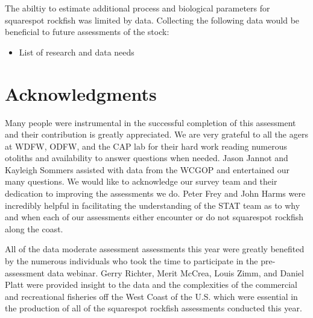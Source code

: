 \documentclass[11pt,
  english,
  a4paper,
]{article}
\begin{document}
\leavevmode\tagmcend\tagstructend


The abiltiy to estimate additional process and biological parameters for squarespot rockfish was limited by data. Collecting the following data would be beneficial to future assessments of the stock:

\leavevmode\tagmcend\tagstructend\par

\begin{itemize}

    \item List of research and data needs

\end{itemize}


\hypertarget{acknowledgments}{%
\section{Acknowledgments}\label{acknowledgments}}

\leavevmode\tagmcend\tagstructend


Many people were instrumental in the successful completion of this assessment and their contribution is greatly appreciated. We are very grateful to all the agers at WDFW, ODFW, and the CAP lab for their hard work reading numerous otoliths and availability to answer questions when needed. Jason Jannot and Kayleigh Sommers assisted with data from the WCGOP and entertained our many questions. We would like to acknowledge our survey team and their dedication to improving the assessments we do. Peter Frey and John Harms were incredibly helpful in facilitating the understanding of the STAT team as to why and when each of our assessments either encounter or do not squarespot rockfish along the coast.

\leavevmode\tagmcend\tagstructend\par


All of the data moderate assessment assessments this year were greatly benefited by the numerous individuals who took the time to participate in the pre-assessment data webinar. Gerry Richter, Merit McCrea, Louis Zimm, and Daniel Platt were provided insight to the data and the complexities of the commercial and recreational fisheries off the West Coast of the U.S. which were essential in the production of all of the squarespot rockfish assessments conducted this year.
\end{document}
